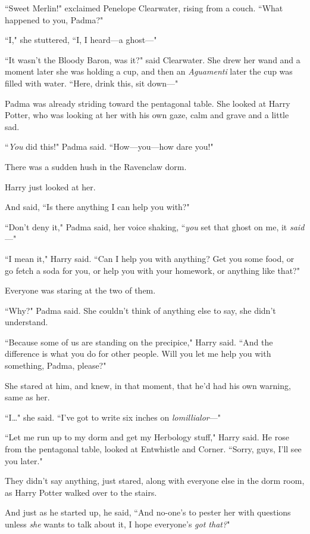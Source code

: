 ``Sweet Merlin!" exclaimed Penelope Clearwater, rising from a couch. ``What happened to you, Padma?"

``I," she stuttered, ``I, I heard—a ghost—"

``It wasn't the Bloody Baron, was it?" said Clearwater. She drew her wand and a moment later she was holding a cup, and then an \emph{Aguamenti} later the cup was filled with water. ``Here, drink this, sit down—"

Padma was already striding toward the pentagonal table. She looked at Harry Potter, who was looking at her with his own gaze, calm and grave and a little sad.

``\emph{You} did this!" Padma said. ``How—you—how dare you!"

There was a sudden hush in the Ravenclaw dorm.

Harry just looked at her.

And said, ``Is there anything I can help you with?"

``Don't deny it," Padma said, her voice shaking, ``\emph{you} set that ghost on me, it \emph{said}—"

``I mean it," Harry said. ``Can I help you with anything? Get you some food, or go fetch a soda for you, or help you with your homework, or anything like that?"

Everyone was staring at the two of them.

``Why?" Padma said. She couldn't think of anything else to say, she didn't understand.

``Because some of us are standing on the precipice," Harry said. ``And the difference is what you do for other people. Will you let me help you with something, Padma, please?"

She stared at him, and knew, in that moment, that he'd had his own warning, same as her.

``I{\ldots}" she said. ``I've got to write six inches on \emph{lomillialor}—"

``Let me run up to my dorm and get my Herbology stuff," Harry said. He rose from the pentagonal table, looked at Entwhistle and Corner. ``Sorry, guys, I'll see you later."

They didn't say anything, just stared, along with everyone else in the dorm room, as Harry Potter walked over to the stairs.

And just as he started up, he said, ``And no-one's to pester her with questions unless \emph{she} wants to talk about it, I hope everyone's \emph{got that?}"

